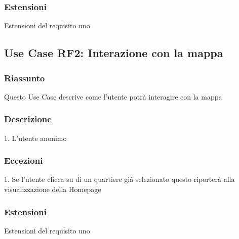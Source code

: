         \subsubsection{Estensioni}
            Estensioni del requisito uno
    \subsection{Use Case {RF2}: Interazione con la mappa}
        \subsubsection{Riassunto}
            Questo Use Case descrive come l'utente potrà interagire con la mappa
        \subsubsection{Descrizione}
            1. L'utente anonimo 
        \subsubsection{Eccezioni}
            1. Se l'utente clicca su di un quartiere già selezionato questo riporterà alla visualizzazione della Homepage
        \subsubsection{Estensioni}
            Estensioni del requisito uno    %
